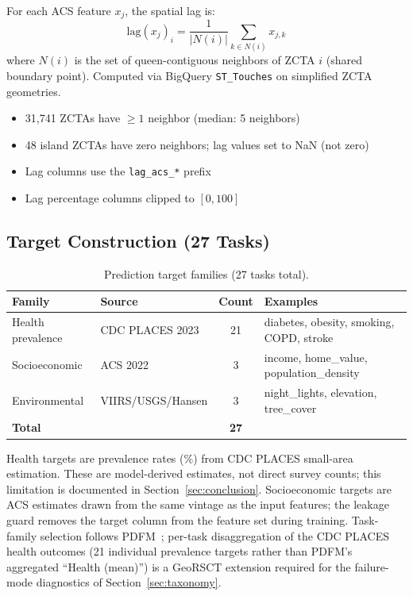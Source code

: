 \documentclass{article}
\begin{document}
For each ACS feature $x_j$, the spatial lag is:
\begin{equation}
\text{lag}(x_j)_i = \frac{1}{|N(i)|} \sum_{k \in N(i)} x_{j,k}
\end{equation}
where $N(i)$ is the set of queen-contiguous neighbors of ZCTA $i$ (shared boundary point). Computed via BigQuery \texttt{ST\_Touches} on simplified ZCTA geometries.

\begin{itemize}
\item 31,741 ZCTAs have $\geq 1$ neighbor (median: 5 neighbors)
\item 48 island ZCTAs have zero neighbors; lag values set to NaN (not zero)
\item Lag columns use the \texttt{lag\_acs\_*} prefix
\item Lag percentage columns clipped to $[0, 100]$
\end{itemize}

\subsection{Target Construction (27 Tasks)}

\begin{table}[htbp]
\centering
\small
\caption{Prediction target families (27 tasks total).}
\label{tab:target_families}
\begin{tabular}{llcl}
\toprule
\textbf{Family} & \textbf{Source} & \textbf{Count} & \textbf{Examples} \\
\midrule
Health prevalence & CDC PLACES 2023 & 21 & diabetes, obesity, smoking, COPD, stroke \\
Socioeconomic & ACS 2022 & 3 & income, home\_value, population\_density \\
Environmental & VIIRS/USGS/Hansen & 3 & night\_lights, elevation, tree\_cover \\
\midrule
\textbf{Total} & & \textbf{27} & \\
\bottomrule
\end{tabular}
\end{table}

Health targets are prevalence rates (\%) from CDC PLACES small-area estimation. These are model-derived estimates, not direct survey counts; this limitation is documented in Section~\ref{sec:conclusion}. Socioeconomic targets are ACS estimates drawn from the same vintage as the input features; the leakage guard removes the target column from the feature set during training. Task-family selection follows PDFM~\citep{agarwal2025pdfm}; per-task disaggregation of the CDC PLACES health outcomes (21 individual prevalence targets rather than PDFM's aggregated ``Health (mean)'') is a GeoRSCT extension required for the failure-mode diagnostics of Section~\ref{sec:taxonomy}.
\end{document}

